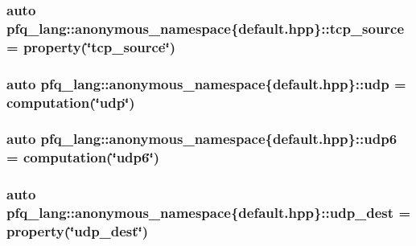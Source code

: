 \hypertarget{namespacepfq__lang_1_1anonymous__namespace_02default_8hpp_03_a4b3ea94407fb5f52e5dfd9e2511f04a8}{
\subsubsection[{tcp\-\_\-source}]{\setlength{\rightskip}{0pt plus 5cm}auto pfq\-\_\-lang\-::anonymous\-\_\-namespace\{default.\-hpp\}\-::tcp\-\_\-source = {\bf property}(\char`\"{}tcp\-\_\-source\char`\"{})}}\label{namespacepfq__lang_1_1anonymous__namespace_02default_8hpp_03_a4b3ea94407fb5f52e5dfd9e2511f04a8}
\hypertarget{namespacepfq__lang_1_1anonymous__namespace_02default_8hpp_03_a1f18de2040dd9d74a07b1c535911abdf}{
\subsubsection[{udp}]{\setlength{\rightskip}{0pt plus 5cm}auto pfq\-\_\-lang\-::anonymous\-\_\-namespace\{default.\-hpp\}\-::udp = {\bf computation}(\char`\"{}udp\char`\"{})}}\label{namespacepfq__lang_1_1anonymous__namespace_02default_8hpp_03_a1f18de2040dd9d74a07b1c535911abdf}
\hypertarget{namespacepfq__lang_1_1anonymous__namespace_02default_8hpp_03_a84b7a888d00d5dfea606f7df96ba0ad3}{
\subsubsection[{udp6}]{\setlength{\rightskip}{0pt plus 5cm}auto pfq\-\_\-lang\-::anonymous\-\_\-namespace\{default.\-hpp\}\-::udp6 = {\bf computation}(\char`\"{}udp6\char`\"{})}}\label{namespacepfq__lang_1_1anonymous__namespace_02default_8hpp_03_a84b7a888d00d5dfea606f7df96ba0ad3}
\hypertarget{namespacepfq__lang_1_1anonymous__namespace_02default_8hpp_03_a4f869214bea58f5ed42b3faded5ab088}{
\subsubsection[{udp\-\_\-dest}]{\setlength{\rightskip}{0pt plus 5cm}auto pfq\-\_\-lang\-::anonymous\-\_\-namespace\{default.\-hpp\}\-::udp\-\_\-dest = {\bf property}(\char`\"{}udp\-\_\-dest\char`\"{})}}\label{namespacepfq__lang_1_1anonymous__namespace_02default_8hpp_03_a4f869214bea58f5ed42b3faded5ab088}
